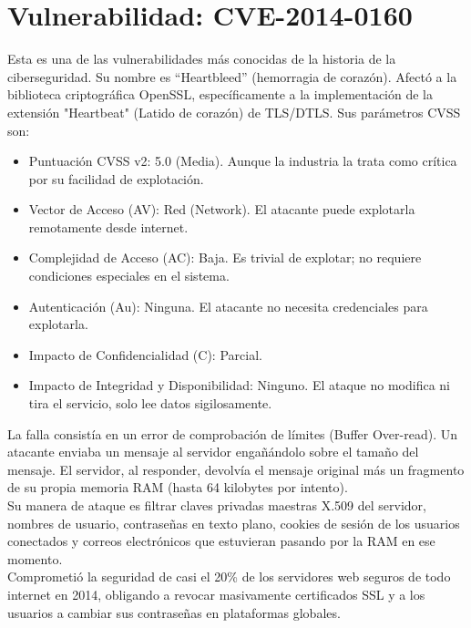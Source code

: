 \section{Vulnerabilidad: CVE-2014-0160}
Esta es una de las vulnerabilidades más conocidas de la historia de la ciberseguridad. Su nombre es ``Heartbleed'' (hemorragia de corazón). Afectó a la biblioteca criptográfica OpenSSL, específicamente a la implementación de la extensión "Heartbeat" (Latido de corazón) de TLS/DTLS. Sus parámetros CVSS son:
\begin{itemize}
	\item Puntuación CVSS v2: 5.0 (Media). Aunque la industria la trata como crítica por su facilidad de explotación.
	\item Vector de Acceso (AV): Red (Network). El atacante puede explotarla remotamente desde internet.
	\item Complejidad de Acceso (AC): Baja. Es trivial de explotar; no requiere condiciones especiales en el sistema.
	\item Autenticación (Au): Ninguna. El atacante no necesita credenciales para explotarla.
	\item Impacto de Confidencialidad (C): Parcial.
	\item Impacto de Integridad y Disponibilidad: Ninguno. El ataque no modifica ni tira el servicio, solo lee datos sigilosamente.
\end{itemize}
La falla consistía en un error de comprobación de límites (Buffer Over-read). Un atacante enviaba un mensaje al servidor engañándolo sobre el tamaño del mensaje. El servidor, al responder, devolvía el mensaje original más un fragmento de su propia memoria RAM (hasta 64 kilobytes por intento). \\
Su manera de ataque es filtrar claves privadas maestras X.509 del servidor, nombres de usuario, contraseñas en texto plano, cookies de sesión de los usuarios conectados y correos electrónicos que estuvieran pasando por la RAM en ese momento. \\
Comprometió la seguridad de casi el 20\% de los servidores web seguros de todo internet en 2014, obligando a revocar masivamente certificados SSL y a los usuarios a cambiar sus contraseñas en plataformas globales.
